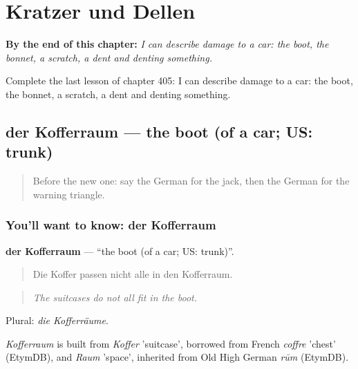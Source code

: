 
\chapter{Kratzer und Dellen}
\label{ch:ge-kratzer-und-dellen}

\begin{chapteropening}
\textbf{By the end of this chapter:} \emph{I can describe damage to a car: the boot, the bonnet, a scratch, a dent and denting something.}

Complete the last lesson of chapter 405: I can describe damage to a car: the boot, the bonnet, a scratch, a dent and denting something.
\end{chapteropening}

\section[der Kofferraum]{der Kofferraum — the boot (of a car; US: trunk)}

\label{lesson:GE-C405-kofferraum}



\begin{quote}
Before the new one: say the German for the jack, then the German for the warning triangle.
\end{quote}

\subsection*{You'll want to know: der Kofferraum}
\textbf{der Kofferraum} — \textquotedblleft{}the boot (of a car; US: trunk)\textquotedblright{}.

\begin{quote}
Die Koffer passen nicht alle in den Kofferraum.
\end{quote}

\begin{quote}
\emph{The suitcases do not all fit in the boot.}
\end{quote}

Plural: \emph{die Kofferräume}.

\begin{cousinweb}
\emph{Kofferraum} is built from \emph{Koffer} 'suitcase', borrowed from French \emph{coffre} 'chest' (EtymDB), and \emph{Raum} 'space', inherited from Old High German \emph{rūm} (EtymDB).
\end{cousinweb}

